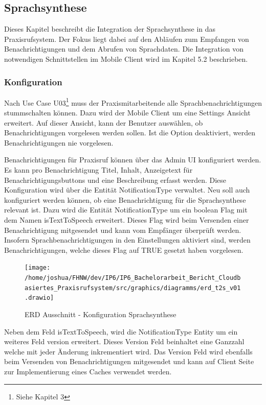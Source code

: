\subsection{Sprachsynthese}

Dieses Kapitel beschreibt die Integration der Sprachsynthese in das Praxisrufsystem.
Der Fokus liegt dabei auf den Abläufen zum Empfangen von Benachrichtigungen und dem Abrufen von Sprachdaten.
Die Integration von notwendigen Schnittstellen im Mobile Client wird im Kapitel 5.2 beschrieben.

\subsubsection{Konfiguration}

Nach Use Case U03\footnote{Siehe Kapitel 3} muss der Praxismitarbeitende alle Sprachbenachrichtigungen stummschalten können.
Dazu wird der Mobile Client um eine Settings Ansicht erweitert.
Auf dieser Ansicht, kann der Benutzer auswählen, ob Benachrichtigungen vorgelesen werden sollen.
Ist die Option deaktiviert, werden Benachrichtigungen nie vorgelesen.

Benachrichtigungen für Praxisruf können über das Admin UI konfiguriert werden.
Es kann pro Benachrichtigung Titel, Inhalt, Anzeigetext für Benachrichtigungsbuttons und eine Beschreibung erfasst werden.
Diese Konfiguration wird über die Entität NotificationType verwaltet.
Neu soll auch konfiguriert werden können, ob eine Benachrichtigung für die Sprachsynthese relevant ist.
Dazu wird die Entität NotificationType um ein boolean Flag mit dem Namen isTextToSpeech erweitert.
Dieses Flag wird beim Versenden einer Benachrichtigung mitgesendet und kann vom Empfänger überprüft werden.
Insofern Sprachbenachrichtigungen in den Einstellungen aktiviert sind, werden Benachrichtigungen, welche dieses Flag auf TRUE gesetzt haben vorgelesen.

\begin{figure}[h]
    \centering
    \begin{minipage}[b]{0.75\textwidth}
        \texttt{[image: /home/joshua/FHNW/dev/IP6/IP6\_Bachelorarbeit\_Bericht\_Cloudbasiertes\_Praxisrufsystem/src/graphics/diagramms/erd\_t2s\_v01.drawio]}
        \caption{ERD Ausschnitt - Konfiguration Sprachsynthese}
    \end{minipage}
\end{figure}

Neben dem Feld isTextToSpeech, wird die NotificationType Entity um ein weiteres Feld version erweitert.
Dieses Version Feld beinhaltet eine Ganzzahl welche mit jeder Änderung inkrementiert wird.
Das Version Feld wird ebenfalls beim Versenden von Benachrichtigungen mitgesendet und kann auf Client Seite zur Implementierung eines Caches verwendet werden.


